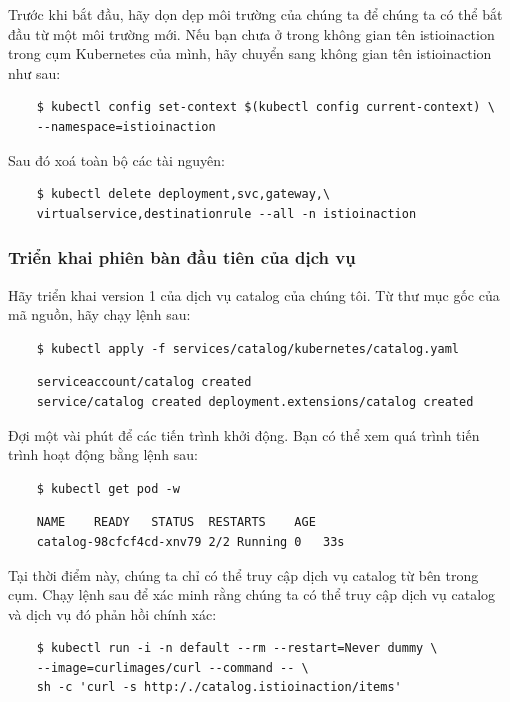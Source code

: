 \documentclass[12pt,a4paper]{report}
\begin{document}
Trước khi bắt đầu, hãy dọn dẹp môi trường của chúng ta để chúng ta có thể bắt đầu từ một môi trường mới. Nếu bạn chưa ở trong không gian tên istioinaction trong cụm Kubernetes của mình, hãy chuyển sang không gian tên istioinaction như sau:
\begin{lstlisting}
	$ kubectl config set-context $(kubectl config current-context) \
	--namespace=istioinaction
\end{lstlisting}

Sau đó xoá toàn bộ các tài nguyên:
\begin{lstlisting}
	$ kubectl delete deployment,svc,gateway,\ 
	virtualservice,destinationrule --all -n istioinaction
\end{lstlisting}
			\subsubsection{Triển khai phiên bàn đầu tiên của dịch vụ}
\hspace{0.6cm}Hãy triển khai version 1 của dịch vụ catalog của chúng tôi. Từ thư mục gốc của mã nguồn, hãy chạy lệnh sau:
\begin{lstlisting}
	$ kubectl apply -f services/catalog/kubernetes/catalog.yaml 
\end{lstlisting}

\begin{verbatim}
	serviceaccount/catalog created
	service/catalog created deployment.extensions/catalog created
\end{verbatim}

Đợi một vài phút để các tiến trình khởi động. Bạn có thể xem quá trình tiến trình hoạt động bằng lệnh sau:
\begin{lstlisting}
	$ kubectl get pod -w
\end{lstlisting}

\begin{verbatim}
	NAME	READY	STATUS	RESTARTS	AGE
	catalog-98cfcf4cd-xnv79	2/2	Running	0	33s
\end{verbatim}

Tại thời điểm này, chúng ta chỉ có thể truy cập dịch vụ catalog từ bên trong cụm. Chạy lệnh sau để xác minh rằng chúng ta có thể truy cập dịch vụ catalog và dịch vụ đó phản hồi chính xác:
\begin{lstlisting}
	$ kubectl run -i -n default --rm --restart=Never dummy \
	--image=curlimages/curl --command -- \
	sh -c 'curl -s http:/./catalog.istioinaction/items'
\end{lstlisting}
\end{document}
